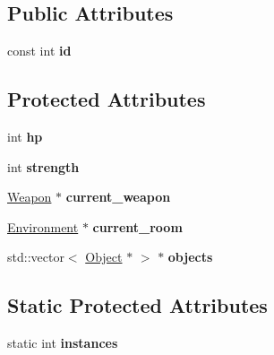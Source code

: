 \subsection*{Public Attributes}
\begin{DoxyCompactItemize}
\item 
\hypertarget{classda__game_1_1Actor_aa469aa0319da09f045ec836890fabf6a}{
const int {\bfseries id}}
\label{classda__game_1_1Actor_aa469aa0319da09f045ec836890fabf6a}

\end{DoxyCompactItemize}
\subsection*{Protected Attributes}
\begin{DoxyCompactItemize}
\item 
\hypertarget{classda__game_1_1Actor_ab5a5b98560a294c0feb2ccf5efb622ea}{
int {\bfseries hp}}
\label{classda__game_1_1Actor_ab5a5b98560a294c0feb2ccf5efb622ea}

\item 
\hypertarget{classda__game_1_1Actor_a134949b1c3dfe71dcadba6d6f9f0d13a}{
int {\bfseries strength}}
\label{classda__game_1_1Actor_a134949b1c3dfe71dcadba6d6f9f0d13a}

\item 
\hypertarget{classda__game_1_1Actor_ac5cc7b2e4c41e85f4222750065be7d80}{
\hyperlink{classda__game_1_1Weapon}{Weapon} $\ast$ {\bfseries current\_\-weapon}}
\label{classda__game_1_1Actor_ac5cc7b2e4c41e85f4222750065be7d80}

\item 
\hypertarget{classda__game_1_1Actor_a0c71533d0498330db5c211bc60147266}{
\hyperlink{classda__game_1_1Environment}{Environment} $\ast$ {\bfseries current\_\-room}}
\label{classda__game_1_1Actor_a0c71533d0498330db5c211bc60147266}

\item 
\hypertarget{classda__game_1_1Actor_ac01a6a22cde1b2e088cbddb81415e0b4}{
std::vector$<$ \hyperlink{classda__game_1_1Object}{Object} $\ast$ $>$ $\ast$ {\bfseries objects}}
\label{classda__game_1_1Actor_ac01a6a22cde1b2e088cbddb81415e0b4}

\end{DoxyCompactItemize}
\subsection*{Static Protected Attributes}
\begin{DoxyCompactItemize}
\item 
\hypertarget{classda__game_1_1Actor_a667364acb9cf6d06df598eeee2675212}{
static int {\bfseries instances}}
\label{classda__game_1_1Actor_a667364acb9cf6d06df598eeee2675212}

\end{DoxyCompactItemize}
